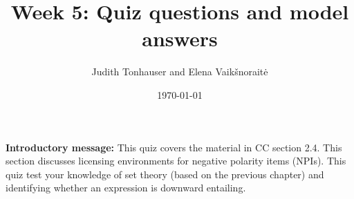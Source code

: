 \documentclass[a4,11pt]{article}
\title{Week 5: Quiz questions and model answers}
\author{Judith Tonhauser and Elena Vaik\v snorait\.{e} }
\date{\today}
\begin{document}
\maketitle

{\bf Introductory message:} This quiz covers the material in CC section 2.4. This section discusses licensing environments for negative polarity items (NPIs). This quiz test your knowledge of set theory (based on the previous chapter) and identifying whether an expression is downward entailing.



\end{document}
